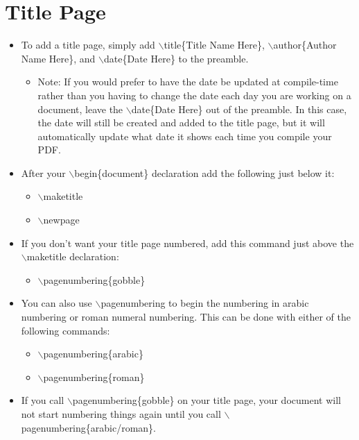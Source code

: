 \documentclass{article}
\begin{document}
	\section{Title Page}
		\begin{itemize}
			\item To add a title page, simply add $\backslash$title\{Title Name Here\}, $\backslash$author\{Author Name Here\}, and $\backslash$date\{Date Here\} to the preamble.
			\begin{itemize}
				\item Note: If you would prefer to  have the date be updated at compile-time rather than you having to change the date each day you are working on a document, leave the $\backslash$date\{Date Here\} out of the preamble. In this case, the date will still be created and added to the title page, but it will automatically update what date it shows each time you compile your PDF.
			\end{itemize}
			\item After your $\backslash$begin\{document\} declaration add the following just below it:
			\begin{itemize}
				\item $\backslash$maketitle
				\item $\backslash$newpage
			\end{itemize}
			\item If you don\rq{}t want your title page numbered, add this command just above the $\backslash$maketitle declaration:
			\begin{itemize}
				\item $\backslash$pagenumbering\{gobble\}
			\end{itemize}
			\item You can also use $\backslash$pagenumbering to begin the numbering in arabic numbering or roman numeral numbering. This can be done with either of the following commands:
			\begin{itemize}
				\item $\backslash$pagenumbering\{arabic\}
				\item $\backslash$pagenumbering\{roman\}
			\end{itemize}
			\item If you call $\backslash$pagenumbering\{gobble\} on your title page, your document will not start numbering things again until you call $\backslash$pagenumbering\{arabic/roman\}.
		\end{itemize}
	
\end{document}
